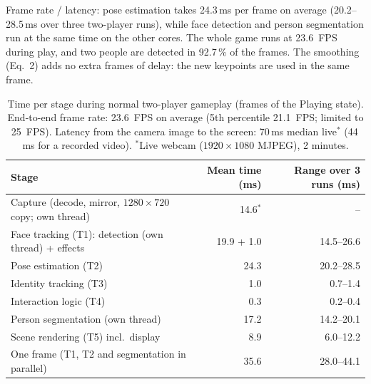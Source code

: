
\item Frame rate / latency: pose estimation takes 24.3\,ms per frame on average (20.2--28.5\,ms over
three two-player runs), while face detection and person segmentation run at the same time on the other cores.
The whole game runs at 23.6~FPS during play, and two people are detected in 92.7\,\% of the frames.
The smoothing (Eq.~2) adds no extra frames of delay: the new keypoints are used in the same frame.

\begin{table}[h]
  \centering\small
  \begin{tabular}{@{}lrr@{}}
    \toprule
    Stage & Mean time (ms) & Range over 3 runs (ms) \\
    \midrule
    Capture (decode, mirror, $1280{\times}720$ copy; own thread) & 14.6$^{*}$ & -- \\
    Face tracking (T1): detection (own thread) + effects & 19.9 + 1.0 & 14.5--26.6 \\
    Pose estimation (T2) & 24.3 & 20.2--28.5 \\
    Identity tracking (T3) & 1.0 & 0.7--1.4 \\
    Interaction logic (T4) & 0.3 & 0.2--0.4 \\
    Person segmentation (own thread) & 17.2 & 14.2--20.1 \\
    Scene rendering (T5) incl.\ display & 8.9 & 6.0--12.2 \\
    \midrule
    One frame (T1, T2 and segmentation in parallel) & 35.6 & 28.0--44.1 \\
    \bottomrule
  \end{tabular}
  \caption{Time per stage during normal two-player gameplay (frames of the Playing state).
  End-to-end frame rate: 23.6~FPS on average (5th percentile 21.1~FPS; limited to 25~FPS).
  Latency from the camera image to the screen: 70\,ms median live$^{*}$ (44\,ms for a recorded video).
  $^{*}$Live webcam ($1920{\times}1080$ MJPEG), 2 minutes.}
  \label{tab:timing}
\end{table}

